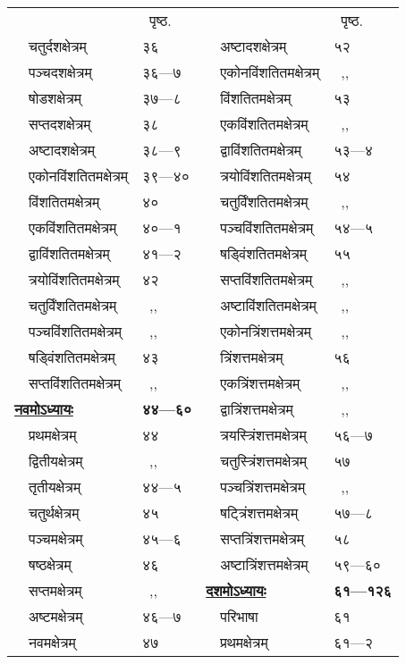 \documentclass[11pt, openany]{book}
\begin{document}
\begin{center}
\begin{tabular}{p{1.5in} l | p{1.5in} l}
& ~पृष्ठ.& & ~पृष्ठ.\\
~~चतुर्दशक्षेत्रम् & ३६ & ~~अष्टादशक्षेत्रम् & ५२\\
~~पञ्चदशक्षेत्रम् & ३६---७ & ~~एकोनविंशतितमक्षेत्रम् & ~,,\\
~~षोडशक्षेत्रम् & ३७---८  & ~~विंशतितमक्षेत्रम् & ५३\\
~~सप्तदशक्षेत्रम् & ३८ & ~~एकविंशतितमक्षेत्रम् & ~,,\\
~~अष्टादशक्षेत्रम् & ३८---९ & ~~द्वाविंशतितमक्षेत्रम् & ५३---४\\
~~एकोनविंशतितमक्षेत्रम् & ३९---४० & ~~त्रयोविंशतितमक्षेत्रम् & ५४\\
~~विंशतितमक्षेत्रम् & ४० & ~~चतुर्विंशतितमक्षेत्रम् & ~,,\\
~~एकविंशतितमक्षेत्रम् & ४०---१ & ~~पञ्चविंशतितमक्षेत्रम् & ५४---५\\
~~द्वाविंशतितमक्षेत्रम् & ४१---२ & ~~षड्विंशतितमक्षेत्रम् & ५५\\
~~त्रयोविंशतितमक्षेत्रम् & ४२ & ~~सप्तविंशतितमक्षेत्रम् & ~,,\\
~~चतुर्विंशतितमक्षेत्रम् & ~,, & ~~अष्टाविंशतितमक्षेत्रम् & ~,,\\
~~पञ्चविंशतितमक्षेत्रम् & ~,, & ~~एकोनत्रिंशत्तमक्षेत्रम् & ~,,\\
~~षड्विंशतितमक्षेत्रम् & ४३ & ~~त्रिंशत्तमक्षेत्रम् & ५६\\
~~सप्तविंशतितमक्षेत्रम् & ~,, & ~~एकत्रिंशत्तमक्षेत्रम् & ~,,\\
\hyperref[ch9]{\textbf{नवमोऽध्यायः}} &\textbf{४४---६०} & ~~द्वात्रिंशत्तमक्षेत्रम् & ~,,\\
~~प्रथमक्षेत्रम् & ४४ & ~~त्रयस्त्रिंशत्तमक्षेत्रम् & ५६---७\\
~~द्वितीयक्षेत्रम् & ~,, & ~~चतुस्त्रिंशत्तमक्षेत्रम् & ५७\\
~~तृतीयक्षेत्रम् & ४४---५ & ~~पञ्चत्रिंशत्तमक्षेत्रम् & ~,,\\
~~चतुर्थक्षेत्रम् & ४५ & ~~षट्त्रिंशत्तमक्षेत्रम् & ५७---८\\
~~पञ्चमक्षेत्रम् & ४५---६ & ~~सप्तत्रिंशत्तमक्षेत्रम् & ५८\\
~~षष्ठक्षेत्रम् & ४६ & ~~अष्टात्रिंशत्तमक्षेत्रम् & ५९---६०\\
~~सप्तमक्षेत्रम् & ~,, & \hyperref[ch10]{\textbf{दशमोऽध्यायः}} & \textbf{६१---१२६}\\
~~अष्टमक्षेत्रम् & ४६---७ & ~~परिभाषा & ६१\\
~~नवमक्षेत्रम् & ४७ & ~~प्रथमक्षेत्रम् & ६१---२\\

\end{tabular}
\end{center}
\end{document}

